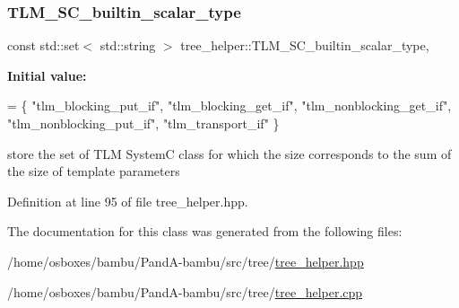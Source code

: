 \subsubsection{\texorpdfstring{T\+L\+M\+\_\+\+S\+C\+\_\+builtin\+\_\+scalar\+\_\+type}{TLM\_SC\_builtin\_scalar\_type}}
{\footnotesize\ttfamily const std\+::set$<$ std\+::string $>$ tree\+\_\+helper\+::\+T\+L\+M\+\_\+\+S\+C\+\_\+builtin\+\_\+scalar\+\_\+type\hspace{0.3cm}{\ttfamily [static]}, {\ttfamily [private]}}

{\bfseries Initial value\+:}
\begin{DoxyCode}
= \{
    \textcolor{stringliteral}{"tlm\_blocking\_put\_if"}, \textcolor{stringliteral}{"tlm\_blocking\_get\_if"}, \textcolor{stringliteral}{"tlm\_nonblocking\_get\_if"}, \textcolor{stringliteral}{"tlm\_nonblocking\_put\_if"},
    \textcolor{stringliteral}{"tlm\_transport\_if"} 
\}
\end{DoxyCode}


store the set of T\+LM SystemC class for which the size corresponds to the sum of the size of template parameters 



Definition at line 95 of file tree\+\_\+helper.\+hpp.



The documentation for this class was generated from the following files\+:\begin{DoxyCompactItemize}
\item 
/home/osboxes/bambu/\+Pand\+A-\/bambu/src/tree/\hyperlink{tree__helper_8hpp}{tree\+\_\+helper.\+hpp}\item 
/home/osboxes/bambu/\+Pand\+A-\/bambu/src/tree/\hyperlink{tree__helper_8cpp}{tree\+\_\+helper.\+cpp}\end{DoxyCompactItemize}

